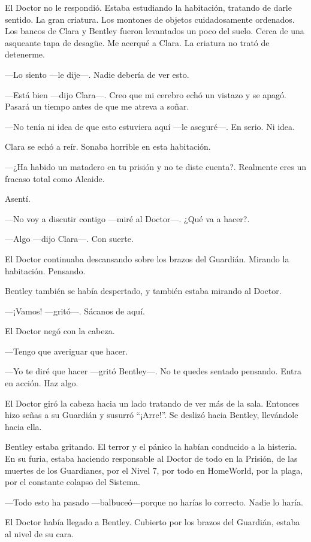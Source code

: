 El Doctor no le respondió. Estaba estudiando la habitación, tratando de
darle sentido. La gran criatura. Los montones de objetos cuidadosamente
ordenados. Los bancos de Clara y Bentley fueron levantados un poco del
suelo. Cerca de una asqueante tapa de desagüe. Me acerqué a Clara. La
criatura no trató de detenerme.

---Lo siento ---le dije---. Nadie debería de ver esto.

---Está bien ---dijo Clara---. Creo que mi cerebro echó un vistazo y se
apagó. Pasará un tiempo antes de que me atreva a soñar.

---No tenía ni idea de que esto estuviera aquí ---le aseguré---. En
serio. Ni idea.

Clara se echó a reír. Sonaba horrible en esta habitación.

---¿Ha habido un matadero en tu prisión y no te diste cuenta?. Realmente
eres un fracaso total como Alcaide.

Asentí.

---No voy a discutir contigo ---miré al Doctor---. ¿Qué va a hacer?.

---Algo ---dijo Clara---. Con suerte.

El Doctor continuaba descansando sobre los brazos del Guardián. Mirando
la habitación. Pensando.

Bentley también se había despertado, y también estaba mirando al Doctor.

---¡Vamos! ---gritó---. Sácanos de aquí.

El Doctor negó con la cabeza.

---Tengo que averiguar que hacer.

---Yo te diré que hacer ---gritó Bentley---. No te quedes sentado
pensando. Entra en acción. Haz algo.

El Doctor giró la cabeza hacia un lado tratando de ver más de la sala.
Entonces hizo señas a su Guardián y susurró ``¡Arre!''. Se deslizó hacia
Bentley, llevándole hacia ella.

Bentley estaba gritando. El terror y el pánico la habían conducido a la
histeria. En su furia, estaba haciendo responsable al Doctor de todo en
la Prisión, de las muertes de los Guardianes, por el Nivel 7, por todo
en HomeWorld, por la plaga, por el constante colapso del Sistema.

---Todo esto ha pasado ---balbuceó---porque no harías lo correcto. Nadie
lo haría.

El Doctor había llegado a Bentley. Cubierto por los brazos del Guardián,
estaba al nivel de su cara.

